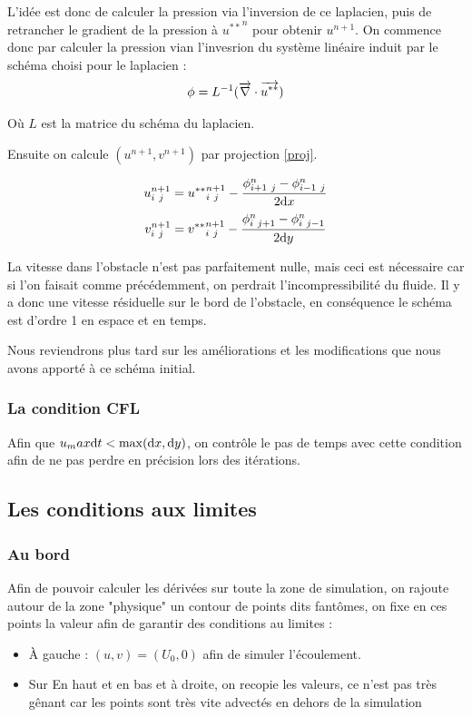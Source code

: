 		L'idée est donc de calculer la pression via l'inversion de ce laplacien, puis de retrancher le gradient de la pression à ${u^{**}}^n$ pour obtenir $u^{n+1}$. On commence donc par calculer la pression vian l'invesrion du système linéaire induit par le schéma choisi pour le laplacien :
		\[ \phi = L^{-1}(\overrightarrow{\nabla} \cdot \overrightarrow{u^{**}})\]
		
		Où $L$ est la matrice du schéma du laplacien.
		
		Ensuite on calcule $(u^{n+1},v^{n+1})$ par projection \eqref{proj}.
		
		\begin{equation}
			u^{n+1}_{i \ j}={u^{**}}_{i \ j}^{n+1} - \frac{\phi^n_{i+1 \ j}-\phi^n_{i-1 \ j}}{2\mathrm{d}x}
			\label{proj}
		\end{equation}
		\[	v^{n+1}_{i \ j}={v^{**}}_{i \ j}^{n+1} - \frac{\phi^n_{i \ j+1}-\phi^n_{i \ j-1}}{2\mathrm{d}y} \]

		La vitesse dans l'obstacle n'est pas parfaitement nulle, mais ceci est nécessaire car si l'on faisait comme précédemment, on perdrait l'incompressibilité du fluide. Il y a donc une vitesse résiduelle sur le bord de l'obstacle, en conséquence le schéma est d'ordre 1 en espace et en temps.
		
		Nous reviendrons plus tard sur les améliorations et les modifications que nous avons apporté à ce schéma initial.		
		
		\subsubsection{La condition CFL}
		
			Afin que $u_max \mathrm{d}t < \max(\mathrm{d}x, \mathrm{d}y)$, on contrôle le pas de temps avec cette condition afin de ne pas perdre en précision lors des itérations.
		
		
	\subsection{Les conditions aux limites}
		
		\subsubsection{Au bord}
			Afin de pouvoir calculer les dérivées sur toute la zone de simulation, on rajoute autour de la zone "physique" un contour de points dits fantômes, on fixe en ces points la valeur afin de garantir des conditions au limites : 
			\begin{itemize}
				\item À gauche : $(u,v) = (U_0,0)$ afin de simuler l'écoulement.
				\item Sur En haut et en bas et à droite, on recopie les valeurs, ce n'est pas très gênant car les points sont très vite advectés en dehors de la simulation
			\end{itemize}
		
